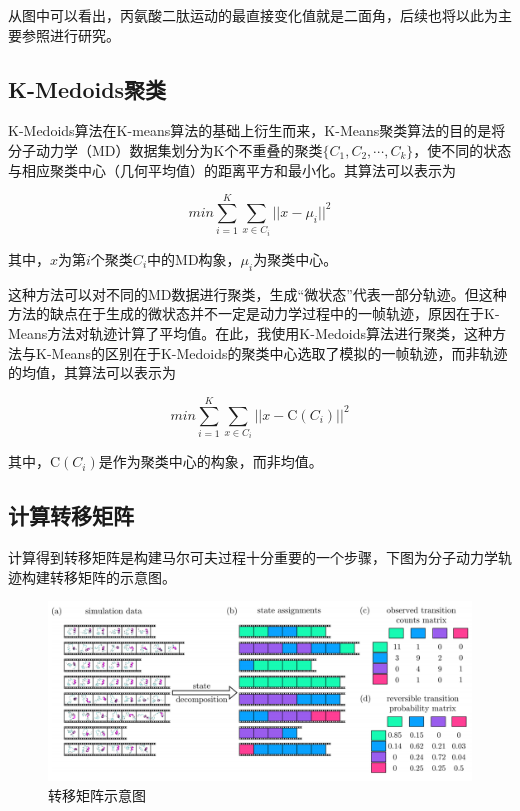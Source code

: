 \documentclass[a4paper]{article}
\begin{document}
\begin{CJK}{UTF8}{gbsn}
	从图中可以看出，丙氨酸二肽运动的最直接变化值就是二面角，后续也将以此为主要参照进行研究。


	
	\subsection{K-Medoids聚类}
\begin{sloppypar}
K-Medoids算法在K-means算法的基础上衍生而来\cite{chodera2007automatic}，K-Means聚类算法的目的是将分子动力学（MD）数据集划分为K个不重叠的聚类$\{C_{1},C_{2}, \cdots,  C_{k}\}$，使不同的状态与相应聚类中心（几何平均值）的距离平方和最小化。其算法可以表示为

\begin{equation}
min\sum_{i=1}^{K}\sum_{x\in C_{i}}^{} {\vert\vert x- \mu_{i} \vert\vert}^{2}
\end{equation}

其中，$x$为第$i$个聚类$C_{i}$中的MD构象，$\mu_{i}$为聚类中心。


这种方法可以对不同的MD数据进行聚类，生成“微状态”代表一部分轨迹。但这种方法的缺点在于生成的微状态并不一定是动力学过程中的一帧轨迹，原因在于K-Means方法对轨迹计算了平均值。在此，我使用K-Medoids算法进行聚类，这种方法与K-Means的区别在于K-Medoids的聚类中心选取了模拟的一帧轨迹，而非轨迹的均值，其算法可以表示为

\begin{equation}
min\sum_{i=1}^{K}\sum_{x\in C_{i}}^{} {\vert\vert x- \mathrm C(C_{i}) \vert\vert}^{2}
\end{equation}


其中，$\mathrm C(C_{i})$是作为聚类中心的构象，而非均值。


	\subsection{计算转移矩阵}
计算得到转移矩阵是构建马尔可夫过程十分重要的一个步骤，下图为分子动力学轨迹构建转移矩阵的示意图\cite{husic2018markov}。

\begin{figure}[H]
\centering
\includegraphics[scale=0.48]{trans_matrix.png}
\caption{转移矩阵示意图}
\end{figure}




\end{sloppypar}
\end{CJK}
\end{document}
